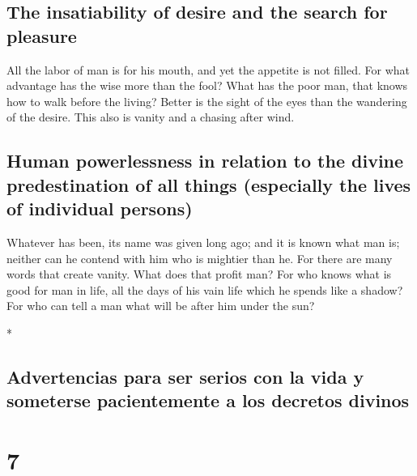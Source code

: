 \begin{paracol}{2}
\begin{otherlanguage}{english}
\hypertarget{the-insatiability-of-desire-and-the-search-for-pleasure}{%
\subsection{The insatiability of desire and the search for
pleasure}\label{the-insatiability-of-desire-and-the-search-for-pleasure}}

 All the labor of man is for his mouth, and yet the
appetite is not filled.  For what advantage has the wise
more than the fool? What has the poor man, that knows how to walk before
the living?  Better is the sight of the eyes than the
wandering of the desire. This also is vanity and a chasing after wind.

\hypertarget{human-powerlessness-in-relation-to-the-divine-predestination-of-all-things-especially-the-lives-of-individual-persons}{%
\subsection{Human powerlessness in relation to the divine predestination
of all things (especially the lives of individual
persons)}\label{human-powerlessness-in-relation-to-the-divine-predestination-of-all-things-especially-the-lives-of-individual-persons}}

 Whatever has been, its name was given long ago; and it
is known what man is; neither can he contend with him who is mightier
than he.  For there are many words that create vanity.
What does that profit man?  For who knows what is good
for man in life, all the days of his vain life which he spends like a
shadow? For who can tell a man what will be after him under the sun?

\end{otherlanguage}

\switchcolumn[0]*

\hypertarget{advertencias-para-ser-serios-con-la-vida-y-someterse-pacientemente-a-los-decretos-divinos}{%
\subsection{Advertencias para ser serios con la vida y someterse
pacientemente a los decretos
divinos}\label{advertencias-para-ser-serios-con-la-vida-y-someterse-pacientemente-a-los-decretos-divinos}}

\hypertarget{section-12}{%
\section{7}\label{section-12}}


\end{paracol}
